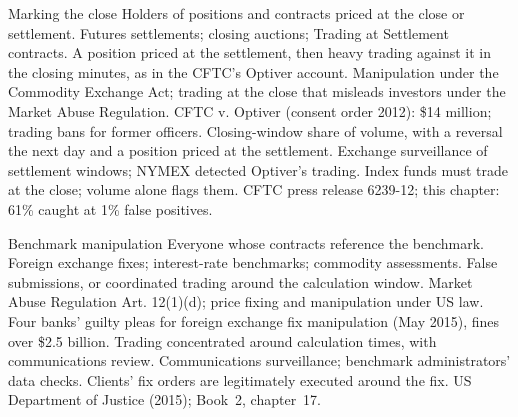 \begin{strategyfile}{Marking the close}\label{strat:s2:manipulative-strategies-and-how-they-are-caught:close}
 Holders of positions and contracts priced at the close or settlement.
 Futures settlements; closing auctions; Trading at Settlement contracts.
 A position priced at the settlement, then heavy trading against it in the closing minutes, as in the CFTC's Optiver account.
 Manipulation under the Commodity Exchange Act; trading at the close that misleads investors under the Market Abuse
Regulation.
 CFTC v. Optiver (consent order 2012): \$14 million; trading bans for former officers.
 Closing-window share of volume, with a reversal the next day and a position priced at the settlement.
 Exchange surveillance of settlement windows; NYMEX detected Optiver's trading.
 Index funds must trade at the close; volume alone flags them.
 CFTC press release 6239-12; this chapter: 61\% caught at 1\% false positives.
\end{strategyfile}

\begin{strategyfile}{Benchmark manipulation}\label{strat:s2:manipulative-strategies-and-how-they-are-caught:benchmark}
 Everyone whose contracts reference the benchmark.
 Foreign exchange fixes; interest-rate benchmarks; commodity assessments.
 False submissions, or coordinated trading around the calculation window.
 Market Abuse Regulation Art. 12(1)(d); price fixing and manipulation under US law.
 Four banks' guilty pleas for foreign exchange fix manipulation (May 2015), fines over \$2.5 billion.
 Trading concentrated around calculation times, with communications review.
 Communications surveillance; benchmark administrators' data checks.
 Clients' fix orders are legitimately executed around the fix.
 US Department of Justice (2015); Book~2, chapter~17.
\end{strategyfile}

